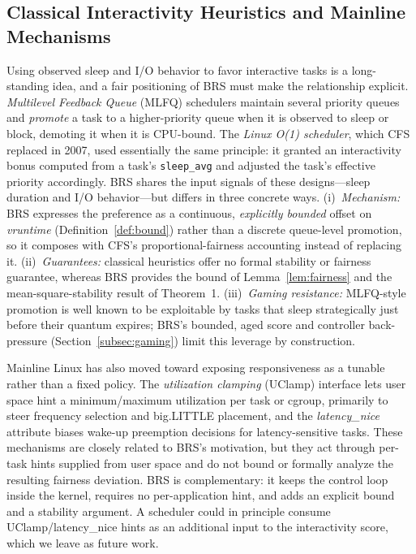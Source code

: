 \subsection{Classical Interactivity Heuristics and Mainline Mechanisms}
\label{subsec:rw-mlfq}
Using observed sleep and I/O behavior to favor interactive tasks is a long-standing idea, and a fair positioning of BRS must make the relationship explicit. \emph{Multilevel Feedback Queue} (MLFQ) schedulers maintain several priority queues and \emph{promote} a task to a higher-priority queue when it is observed to sleep or block, demoting it when it is CPU-bound. The \emph{Linux O(1) scheduler}, which CFS replaced in 2007, used essentially the same principle: it granted an interactivity bonus computed from a task's \texttt{sleep\_avg} and adjusted the task's effective priority accordingly. BRS shares the input signals of these designs---sleep duration and I/O behavior---but differs in three concrete ways. (i)~\emph{Mechanism:} BRS expresses the preference as a continuous, \emph{explicitly bounded} offset on \textit{vruntime} (Definition~\ref{def:bound}) rather than a discrete queue-level promotion, so it composes with CFS's proportional-fairness accounting instead of replacing it. (ii)~\emph{Guarantees:} classical heuristics offer no formal stability or fairness guarantee, whereas BRS provides the bound of Lemma~\ref{lem:fairness} and the mean-square-stability result of Theorem~1. (iii)~\emph{Gaming resistance:} MLFQ-style promotion is well known to be exploitable by tasks that sleep strategically just before their quantum expires; BRS's bounded, aged score and controller back-pressure (Section~\ref{subsec:gaming}) limit this leverage by construction.

Mainline Linux has also moved toward exposing responsiveness as a tunable rather than a fixed policy. The \emph{utilization clamping} (UClamp) interface lets user space hint a minimum/maximum utilization per task or cgroup, primarily to steer frequency selection and big.LITTLE placement, and the \emph{latency\_nice} attribute biases wake-up preemption decisions for latency-sensitive tasks. These mechanisms are closely related to BRS's motivation, but they act through per-task hints supplied from user space and do not bound or formally analyze the resulting fairness deviation. BRS is complementary: it keeps the control loop inside the kernel, requires no per-application hint, and adds an explicit bound and a stability argument. A scheduler could in principle consume UClamp/latency\_nice hints as an additional input to the interactivity score, which we leave as future work.

